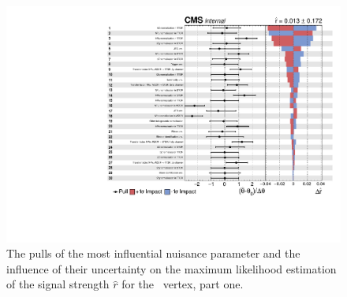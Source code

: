 \newpage

\begin{figure}[htbp] 
	\centering
	\includegraphics[page=1,width=.99\linewidth,keepaspectratio]{6_Search/Figures/impact/171102Zct.pdf}
	\caption{The pulls of the most influential nuisance parameter and the influence of their uncertainty on the maximum likelihood estimation of the signal strength $\hat{r}$ for the \Zct\ vertex, part one.}
	\label{fig:impactsZct1}
\end{figure}


\clearpage

